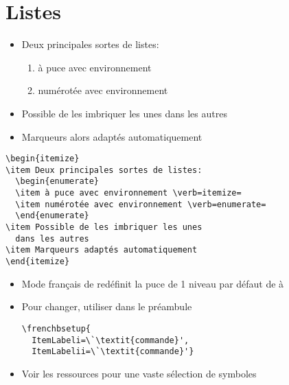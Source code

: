 \section{Listes}

\begin{itemize}
\item Deux principales sortes de listes:
  \begin{enumerate}
  \item à puce avec environnement 
  \item numérotée avec environnement 
  \end{enumerate}
\item Possible de les imbriquer les unes dans les autres
\item Marqueurs alors adaptés automatiquement
\end{itemize}

\begin{demo}
\begin{lstlisting}
\begin{itemize}
\item Deux principales sortes de listes:
  \begin{enumerate}
  \item à puce avec environnement \verb=itemize=
  \item numérotée avec environnement \verb=enumerate=
  \end{enumerate}
\item Possible de les imbriquer les unes
  dans les autres
\item Marqueurs adaptés automatiquement
\end{itemize}
\end{lstlisting}
\end{demo}

\begin{information}
  \begin{itemize}
  \item Mode français de  redéfinit la puce de 1{\ier}
    niveau par défaut de {\textbullet} à {\textemdash}
  \item Pour changer, utiliser dans le préambule
\begin{lstlisting}
\frenchbsetup{
  ItemLabeli=\`\textit{commande}',
  ItemLabelii=\`\textit{commande}'}
\end{lstlisting}
  \item Voir les ressources pour une vaste sélection de symboles
  \end{itemize}
\end{information}

